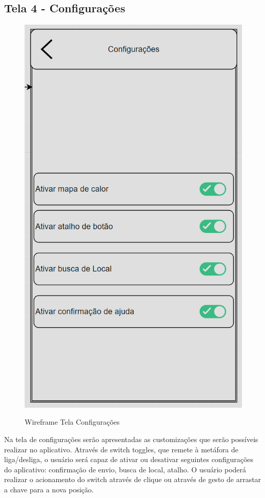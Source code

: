 \subsection{Tela 4 - Configurações}
\begin{figure}[H]
  \begin{center}
  \includegraphics[width=0.2\linewidth]{images/wire-tela-configuracoes.png}\\
  \end{center}
  \caption[Wireframe Tela Configurações]{Wireframe Tela Configurações}
  \label{fig:wireframe-tela-configuracoes}
\end{figure}
Na tela de configurações serão apresentadas as customizações que serão possíveis realizar no aplicativo. Através de switch toggles, que remete à metáfora de liga/desliga, o usuário será capaz de ativar ou desativar seguintes configurações do aplicativo: confirmação de envio, busca de local, atalho. O usuário poderá realizar o acionamento do switch através de clique ou através de gesto de arrastar a chave para a nova posição.
